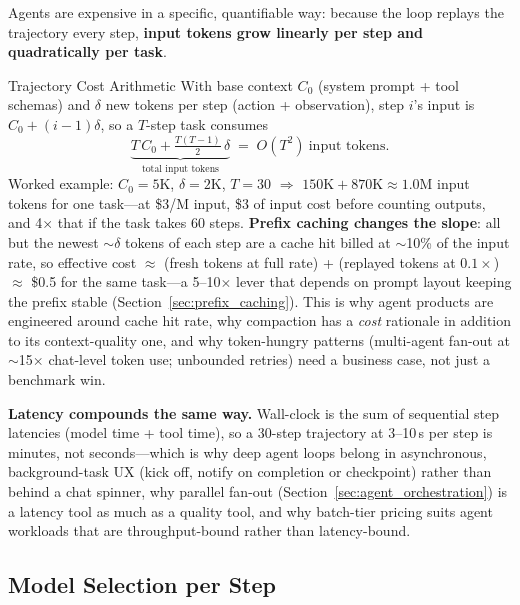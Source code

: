 Agents are expensive in a specific, quantifiable way: because the loop replays the trajectory every step, \textbf{input tokens grow linearly per step and quadratically per task}.

\begin{mathresult}{Trajectory Cost Arithmetic}
With base context $C_0$ (system prompt + tool schemas) and $\delta$ new tokens per step (action + observation), step $i$'s input is $C_0 + (i-1)\delta$, so a $T$-step task consumes
\[
\underbrace{T\,C_0 + \tfrac{T(T-1)}{2}\,\delta}_{\text{total input tokens}} \;=\; O(T^2)\ \text{input tokens.}
\]
Worked example: $C_0 = 5$K, $\delta = 2$K, $T = 30$ $\Rightarrow$ $150\text{K} + 870\text{K} \approx 1.0$M input tokens for one task---at \$3/M input, \$3 of input cost before counting outputs, and 4$\times$ that if the task takes 60 steps. \textbf{Prefix caching changes the slope}: all but the newest $\sim\delta$ tokens of each step are a cache hit billed at $\sim$10\% of the input rate, so effective cost $\approx$ (fresh tokens at full rate) + (replayed tokens at $0.1\times$) $\approx$ \$0.5 for the same task---a 5--10$\times$ lever that depends on prompt layout keeping the prefix stable (Section~\ref{sec:prefix_caching}). This is why agent products are engineered around cache hit rate, why compaction has a \textit{cost} rationale in addition to its context-quality one, and why token-hungry patterns (multi-agent fan-out at $\sim$15$\times$ chat-level token use; unbounded retries) need a business case, not just a benchmark win.
\end{mathresult}

\textbf{Latency compounds the same way.} Wall-clock is the sum of sequential step latencies (model time + tool time), so a 30-step trajectory at 3--10\,s per step is minutes, not seconds---which is why deep agent loops belong in asynchronous, background-task UX (kick off, notify on completion or checkpoint) rather than behind a chat spinner, why parallel fan-out (Section~\ref{sec:agent_orchestration}) is a latency tool as much as a quality tool, and why batch-tier pricing suits agent workloads that are throughput-bound rather than latency-bound.

\subsection{Model Selection per Step}

